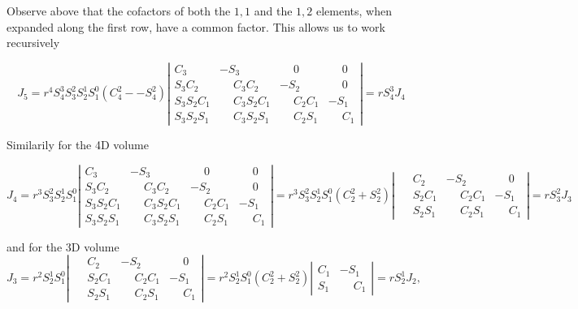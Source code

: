 {Observe above that the cofactors of both the $1,1$ and the $1,2$ elements, when expanded along the first row, have a common factor.  This allows us to work recursively

\begin{dmath}\label{eqn:basicStatMechProblemSet3Problem1:200}
J_5 
= r^4 S_4^3 S_3^2 S_2^1 S_1^0
(C_4^2 - - S_4^2)
\left\lvert
\begin{array}{llll}
C_3           &          -  S_3          & \phantom{-} 0       & \phantom{-} 0    \\
S_3 C_2       & \phantom{-} C_3 C_2      &          -  S_2     & \phantom{-} 0    \\
S_3 S_2 C_1   & \phantom{-} C_3 S_2 C_1  & \phantom{-} C_2 C_1 &          -  S_1  \\
S_3 S_2 S_1   & \phantom{-} C_3 S_2 S_1  & \phantom{-} C_2 S_1 & \phantom{-} C_1   
\end{array}
\right\rvert
=
r S_4^3 J_4
\end{dmath}

Similarily for the 4D volume

\begin{dmath}\label{eqn:basicStatMechProblemSet3Problem1:220}
J_4  
= r^3 S_3^2 S_2^1 S_1^0
\left\lvert
\begin{array}{llll}
C_3           &          -  S_3          & \phantom{-} 0       & \phantom{-} 0    \\
S_3 C_2       & \phantom{-} C_3 C_2      &          -  S_2     & \phantom{-} 0    \\
S_3 S_2 C_1   & \phantom{-} C_3 S_2 C_1  & \phantom{-} C_2 C_1 &          -  S_1  \\
S_3 S_2 S_1   & \phantom{-} C_3 S_2 S_1  & \phantom{-} C_2 S_1 & \phantom{-} C_1   
\end{array}
\right\rvert
= r^3 S_3^2 S_2^1 S_1^0 (C_2^2 + S_2^2)
\left\lvert
\begin{array}{lll}
\phantom{-} C_2      &          -  S_2     & \phantom{-} 0    \\
\phantom{-} S_2 C_1  & \phantom{-} C_2 C_1 &          -  S_1  \\
\phantom{-} S_2 S_1  & \phantom{-} C_2 S_1 & \phantom{-} C_1   
\end{array}
\right\rvert
= r S_3^2 J_3
\end{dmath}

and for the 3D volume
\begin{dmath}\label{eqn:basicStatMechProblemSet3Problem1:240}
J_3  
= r^2 S_2^1 S_1^0
\left\lvert
\begin{array}{lll}
\phantom{-} C_2      &          -  S_2     & \phantom{-} 0    \\
\phantom{-} S_2 C_1  & \phantom{-} C_2 C_1 &          -  S_1  \\
\phantom{-} S_2 S_1  & \phantom{-} C_2 S_1 & \phantom{-} C_1   
\end{array}
\right\rvert
= r^2 S_2^1 S_1^0 (C_2^2 + S_2^2)
\left\lvert
\begin{array}{ll}
C_1 &          -  S_1  \\
S_1 & \phantom{-} C_1   
\end{array}
\right\rvert
= r S_2^1 J_2,
\end{dmath}

}
